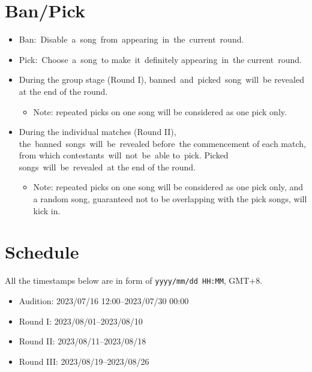\documentclass{article}
\newcommand{\alert}[1]{{\color{red} #1}}
\begin{document}
\section{Ban/Pick}

\begin{itemize}
	\item Ban: Disable a song from appearing in the current round.

	\item Pick: Choose a song to make it definitely
	      appearing in the current round.  %

	\item During the group stage (Round I),
	      banned and picked song will be revealed
	      at the end of the round.
	      \begin{itemize}
		      \item \alert{
			            Note: repeated picks on one
			            song will be considered as one pick only.
		            }
	      \end{itemize}

	\item During the individual matches (Round II),
	      the banned songs will be revealed before the commencement of each match,
	      from which contestants will not be able to pick.
	      Picked songs will be revealed at the end of the round.
	      \begin{itemize}
		      \item \alert{
			            Note: repeated picks on one
			            song will be considered as one pick only,
			            and a random song,
			            guaranteed not to be
			            overlapping with the pick songs,
			            will kick in.  %
		            }
	      \end{itemize}
\end{itemize}

\section{Schedule}

All the timestamps below are in form of
\texttt{yyyy/mm/dd HH:MM}, GMT+8.

\begin{itemize}
	\item   Audition: 2023/07/16 12:00--2023/07/30 00:00
	\item   Round I: 2023/08/01--2023/08/10
	\item   Round II: 2023/08/11--2023/08/18
	\item   Round III: 2023/08/19--2023/08/26
\end{itemize}
\end{document}
